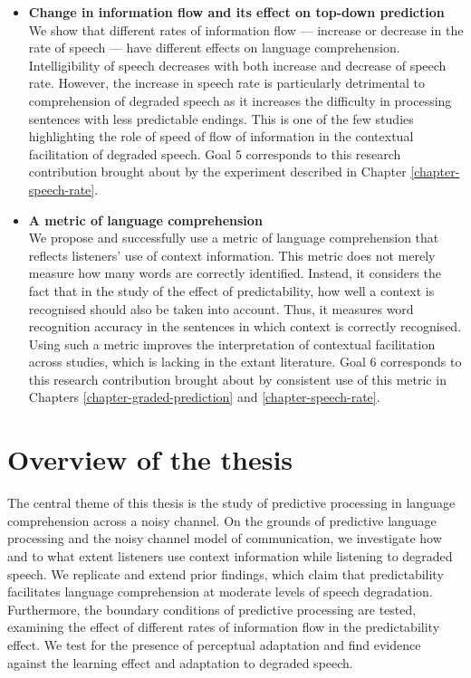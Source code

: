 \documentclass[a4paper, nobind]{templates/ociamthesis}
\begin{document}
\begin{itemize}
\item
  \textbf{Change in information flow and its effect on top-down prediction}\\
  We show that different rates of information flow --- increase or decrease in the rate of speech --- have different effects on language comprehension.
  Intelligibility of speech decreases with both increase and decrease of speech rate.
  However, the increase in speech rate is particularly detrimental to comprehension of degraded speech as it increases the difficulty in processing sentences with less predictable endings.
  This is one of the few studies highlighting the role of speed of flow of information in the contextual facilitation of degraded speech.
  Goal 5 corresponds to this research contribution brought about by the experiment described in Chapter \ref{chapter-speech-rate}.
\item
  \textbf{A metric of language comprehension}\\
  We propose and successfully use a metric of language comprehension that reflects listeners' use of context information.
  This metric does not merely measure how many words are correctly identified.
  Instead, it considers the fact that in the study of the effect of predictability, how well a context is recognised should also be taken into account.
  Thus, it measures word recognition accuracy in the sentences in which context is correctly recognised.
  Using such a metric improves the interpretation of contextual facilitation across studies, which is lacking in the extant literature.
  Goal 6 corresponds to this research contribution brought about by consistent use of this metric in Chapters \ref{chapter-graded-prediction} and \ref{chapter-speech-rate}.
\end{itemize}

\hypertarget{overview-of-the-thesis}{%
\section{Overview of the thesis}\label{overview-of-the-thesis}}

The central theme of this thesis is the study of predictive processing in language comprehension across a noisy channel.
On the grounds of predictive language processing and the noisy channel model of communication,
we investigate how and to what extent listeners use context information while listening to degraded speech.
We replicate and extend prior findings, which claim that predictability facilitates language comprehension at moderate levels of speech degradation.
Furthermore, the boundary conditions of predictive processing are tested, examining the effect of different rates of information flow in the predictability effect.
We test for the presence of perceptual adaptation and find evidence against the learning effect and adaptation to degraded speech.
\end{document}
